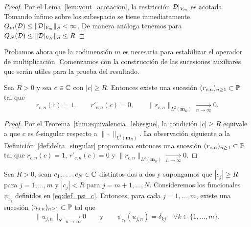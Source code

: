 \begin{proof}
	Por el Lema~\ref{lem:vout_acotacion}, la restricción $\mathcal{D}|_{V_m}$ es acotada. Tomando ínfimo sobre los subespacio se tiene inmediatamente
	\(Q_m(\mathcal{D})\le \|\mathcal{D}|_{V_m}\|_S<\infty\). De manera análoga tenemos para \(Q_N(\mathcal{D})\le \|\mathcal{D}|_{V_N}\|_S\le R\)
\end{proof}

Probamos ahora que la codimensión $m$ es necesaria para estabilizar el operador de multiplicación. Comenzamos con la construcción de las sucesiones auxiliares que serán utiles para la prueba del resultado.

\begin{lem}\label{lem:paquete_local_exterior}
	Sea $R>0$ y sea $c\in\mathbb{C}$ con $|c|\ge R$. Entonces existe una sucesión $(r_{c,n})_{n\ge1} \subset \mathbb{P}$ tal que
	\[
		r_{c,n}(c)=1,
		\qquad
		r'_{c,n}(c)=0,
		\qquad
		\|r_{c,n}\|_{L^2(\mathbf{m}_R)}\xrightarrow[n\to\infty]{}0.
	\]
\end{lem}

\begin{proof}
	Por el Teorema~\ref{thm:equivalencia_lebesgue}, la condición $|c|\ge R$ equivale a que $c$ es $\delta$-singular respecto a $\|\cdot\|_{L^2(\mathbf{m}_R)}$. La observación siguiente a la Definición~\ref{def:delta_singular} proporciona entonces una sucesión $(r_{c,n})_{n\ge1}\subset\mathbb{P}$ tal que
	\(r_{c,n}(c)=1\), \(r'_{c,n}(c)=0\) y \(\|r_{c,n}\|_{L^2(\mathbf{m}_R)}\xrightarrow[n\to\infty]{}0\).
\end{proof}

\begin{lem}\label{lem:paquetes_diagonales}
	Sea $R>0$, sean $c_1,\dots,c_N\in\mathbb{C}$ distintos dos a dos y supongamos que $|c_j|\ge R$ para $j=1,\dots,m$ y $|c_j|<R$ para $j=m+1,\dots,N$. Consideremos los funcionales $\psi_{c_k}$ definidos en \eqref{eq:def_psi_c}. Entonces, para cada $j=1,\dots,m$, existe una sucesión $(u_{j,n})_{n\ge1}\subset\mathbb{P}$ tal que
	\[
		\|u_{j,n}\|_S\xrightarrow[n\to\infty]{}0
		\qquad\text{y}\qquad
		\psi_{c_k}(u_{j,n})=\delta_{kj}
		\quad \forall k\in\{1,\dots,m\}.
	\]
\end{lem}

